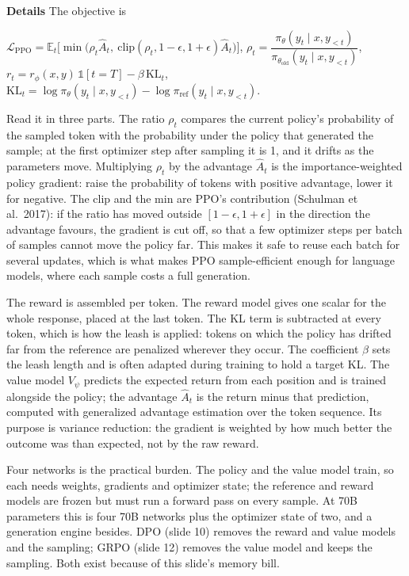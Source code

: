 \documentclass[11pt,letterpaper]{article}
\newcommand{\para}[1]{\medskip\noindent\textbf{#1}\quad}
\newenvironment{formulas}{\begin{tcolorbox}[formulabox]}{\end{tcolorbox}}
\newcommand{\piref}{\pi_{\mathrm{ref}}}
\newcommand{\pit}{\pi_\theta}\newcommand{\KL}{\mathrm{KL}}
\begin{document}
\para{Details} The objective is
\begin{formulas}
$\mathcal{L}_{\text{PPO}}=\mathbb{E}_t\Big[\min\big(\rho_t\hat A_t,\ \mathrm{clip}(\rho_t,1-\epsilon,1+\epsilon)\hat A_t\big)\Big]$, \quad
$\rho_t=\dfrac{\pit(y_t\mid x,y_{<t})}{\pi_{\theta_{\text{old}}}(y_t\mid x,y_{<t})}$,\\[4pt]
$r_t=r_\phi(x,y)\,\mathbb{1}[t=T]-\beta\,\KL_t$, \qquad
$\KL_t=\log\pit(y_t\mid x,y_{<t})-\log\piref(y_t\mid x,y_{<t})$.
\end{formulas}
Read it in three parts. The ratio $\rho_t$ compares the current policy's probability of the sampled token with the probability under the policy that generated the sample; at the first optimizer step after sampling it is 1, and it drifts as the parameters move. Multiplying $\rho_t$ by the advantage $\hat A_t$ is the importance-weighted policy gradient: raise the probability of tokens with positive advantage, lower it for negative. The clip and the min are PPO's contribution (Schulman et al.\ 2017): if the ratio has moved outside $[1-\epsilon,1+\epsilon]$ in the direction the advantage favours, the gradient is cut off, so that a few optimizer steps per batch of samples cannot move the policy far. This makes it safe to reuse each batch for several updates, which is what makes PPO sample-efficient enough for language models, where each sample costs a full generation.

The reward is assembled per token. The reward model gives one scalar for the whole response, placed at the last token. The KL term is subtracted at every token, which is how the leash is applied: tokens on which the policy has drifted far from the reference are penalized wherever they occur. The coefficient $\beta$ sets the leash length and is often adapted during training to hold a target KL. The value model $V_\psi$ predicts the expected return from each position and is trained alongside the policy; the advantage $\hat A_t$ is the return minus that prediction, computed with generalized advantage estimation over the token sequence. Its purpose is variance reduction: the gradient is weighted by how much better the outcome was than expected, not by the raw reward.

Four networks is the practical burden. The policy and the value model train, so each needs weights, gradients and optimizer state; the reference and reward models are frozen but must run a forward pass on every sample. At 70B parameters this is four 70B networks plus the optimizer state of two, and a generation engine besides. DPO (slide 10) removes the reward and value models and the sampling; GRPO (slide 12) removes the value model and keeps the sampling. Both exist because of this slide's memory bill.
\end{document}
